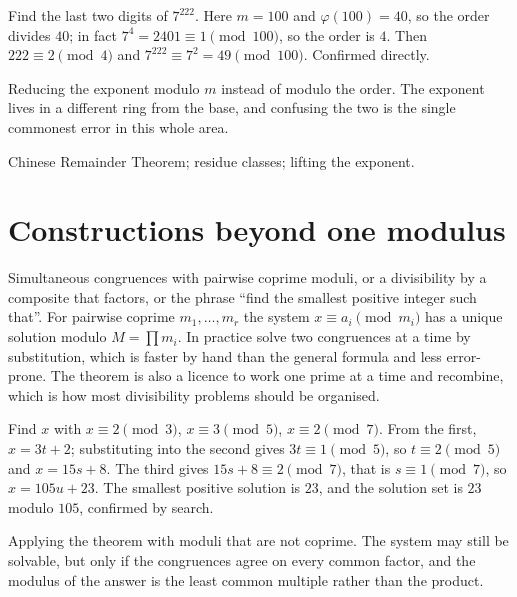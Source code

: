 \begin{worked}
Find the last two digits of $7^{222}$. Here $m=100$ and $\varphi(100)=40$, so the order divides $40$; in fact $7^{4}=2401\equiv1\pmod{100}$, so the order is $4$. Then $222\equiv2\pmod4$ and $7^{222}\equiv7^{2}=49\pmod{100}$. Confirmed directly.
\end{worked}

\begin{trap}
Reducing the exponent modulo $m$ instead of modulo the order. The exponent lives in a different ring from the base, and confusing the two is the single commonest error in this whole area.
\end{trap}

\begin{seealsob}Chinese Remainder Theorem; residue classes; lifting the exponent.\end{seealsob}

\section{Constructions beyond one modulus}

\cue Simultaneous congruences with pairwise coprime moduli, or a divisibility by a composite that factors, or the phrase ``find the smallest positive integer such that''.
\method For pairwise coprime $m_{1},\ldots,m_{r}$ the system $x\equiv a_{i}\pmod{m_{i}}$ has a unique solution modulo $M=\prod m_{i}$. In practice solve two congruences at a time by substitution, which is faster by hand than the general formula and less error-prone. The theorem is also a licence to work one prime at a time and recombine, which is how most divisibility problems should be organised.

\begin{worked}
Find $x$ with $x\equiv2\pmod3$, $x\equiv3\pmod5$, $x\equiv2\pmod7$. From the first, $x=3t+2$; substituting into the second gives $3t\equiv1\pmod5$, so $t\equiv2\pmod5$ and $x=15s+8$. The third gives $15s+8\equiv2\pmod7$, that is $s\equiv1\pmod7$, so $x=105u+23$. The smallest positive solution is $23$, and the solution set is $23$ modulo $105$, confirmed by search.
\end{worked}

\begin{trap}
Applying the theorem with moduli that are not coprime. The system may still be solvable, but only if the congruences agree on every common factor, and the modulus of the answer is the least common multiple rather than the product.
\end{trap}

